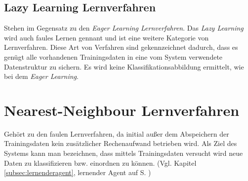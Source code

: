 \documentclass[fontsize=11pt]{scrartcl}
\begin{document}
            \subsection{Lazy Learning Lernverfahren}  
                Stehen im Gegensatz zu den \emph{Eager Learning Lernverfahren}. Das \emph{Lazy Learning} wird auch faules Lernen gennant und ist eine weitere Kategorie von Lernverfahren. Diese Art von Verfahren sind gekennzeichnet dadurch, dass es genügt alle vorhandenen Trainingsdaten in eine vom System verwendete Datenstruktur zu sichern. Es wird keine Klassifikationsabbildung ermittelt, wie bei dem \emph{Eager Learning}. %
                            
                        
        \section{Nearest-Neighbour Lernverfahren}
            Gehört zu den faulen Lernverfahren, da initial außer dem Abspeichern der Trainingsdaten kein zusätzlicher Rechenaufwand betrieben wird. Als Ziel des Systems kann man bezeichnen, dass mittels Trainingsdaten versucht wird neue Daten zu klassifizieren bzw. einordnen zu können. (Vgl. Kapitel \ref{subsec:lernenderagent}, lernender Agent auf S. \pageref{subsec:lernenderagent})
                        
\end{document}
